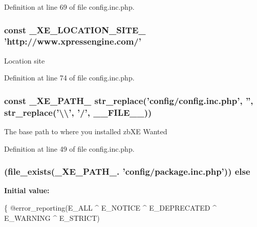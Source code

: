Definition at line 69 of file config.\-inc.\-php.

\hypertarget{config_8inc_8php_a063bfd2eb9f811b1676d0dbc0cad2648}{
\subsubsection[{\-\_\-\-X\-E\-\_\-\-L\-O\-C\-A\-T\-I\-O\-N\-\_\-\-S\-I\-T\-E\-\_\-}]{\setlength{\rightskip}{0pt plus 5cm}const \-\_\-\-X\-E\-\_\-\-L\-O\-C\-A\-T\-I\-O\-N\-\_\-\-S\-I\-T\-E\-\_\- 'http\-://www.\-xpressengine.\-com/'}}\label{config_8inc_8php_a063bfd2eb9f811b1676d0dbc0cad2648}
Location site 

Definition at line 74 of file config.\-inc.\-php.

\hypertarget{config_8inc_8php_a5387c7a3f2aa38adf16f324cee88db88}{
\subsubsection[{\-\_\-\-X\-E\-\_\-\-P\-A\-T\-H\-\_\-}]{\setlength{\rightskip}{0pt plus 5cm}const \-\_\-\-X\-E\-\_\-\-P\-A\-T\-H\-\_\- str\-\_\-replace('config/config.\-inc.\-php', '', str\-\_\-replace('\textbackslash{}\textbackslash{}', '/', \-\_\-\-\_\-\-F\-I\-L\-E\-\_\-\-\_\-))}}\label{config_8inc_8php_a5387c7a3f2aa38adf16f324cee88db88}
The base path to where you installed zb\-X\-E Wanted 

Definition at line 49 of file config.\-inc.\-php.

\hypertarget{config_8inc_8php_a249caa62ba3f93fa3cb8d963d5634fe1}{
\subsubsection[{else}]{ (file\-\_\-exists(\-\_\-\-X\-E\-\_\-\-P\-A\-T\-H\-\_\-. 'config/package.\-inc.\-php')) else}}\label{config_8inc_8php_a249caa62ba3f93fa3cb8d963d5634fe1}
{\bfseries Initial value\-:}
\begin{DoxyCode}
\{
    @error\_reporting(E\_ALL ^ E\_NOTICE ^ E\_DEPRECATED ^ E\_WARNING ^ E\_STRICT)
\end{DoxyCode}


